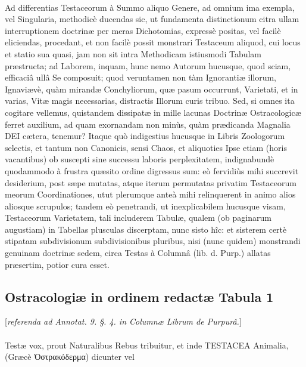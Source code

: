 \documentclass[a4paper, 11pt, oneside, polutonikogreek, german]{article}
\begin{document}
\paragraph{}
Ad differentias Testaceorum à Summo aliquo Genere, ad omnium ima exempla, vel Singularia, methodicè ducendas sic, ut fundamenta distinctionum citra ullam interruptionem doctrinæ per meras Dichotomias, expressè positas, vel facilè eliciendas, procedant, et non facilè possit monstrari Testaceum aliquod, cui locus et statio sua quasi, jam non sit intra Methodicam istiusmodi Tabulam præstructa; ad Laborem, inquam, hunc nemo Autorum hucusque, quod sciam, efficaciâ ullâ Se composuit; quod veruntamen non tàm Ignorantiæ illorum, Ignaviævè, quàm mirandæ Conchyliorum, quæ pasum occurrunt, Varietati, et in varias, Vitæ magis necessarias, distractis Illorum curis tribuo. Sed, si omnes ita cogitare vellemus, quistandem dissipatæ in mille lacunas Doctrinæ Ostracologicæ ferret auxilium, ad quam exornandam non minùs, quàm prædicanda Magnalia DEI cætera, tenemur? Itaque quò indigestius hucusque in Libris Zoologorum selectis, et tantum non Canonicis, sensi Chaos, et aliquoties Ipse etiam (horis vacantibus) ob suscepti sine successu laboris perplexitatem, indignabundè quodammodo à frustra quæsito ordine digressus sum: eò fervidiùs mihi succrevit desiderium, post sæpe mutatas, atque iterum permutatas privatim Testaceorum meorum Coordinationes, utut plerumque anteà mihi relinquerent in animo alios aliosque scrupulos; tandem eò penetrandi, ut inexplicabilem hucusque visam, Testaceorum Varietatem, tali includerem Tabulæ, qualem (ob paginarum augustiam) in Tabellas plusculas discerptam, nunc sisto hîc: et sisterem certè stipatam subdivisionum subdivisionibus pluribus, nisi (nunc quidem) monstrandi genuinam doctrinæ sedem, circa Testas à Columnâ (lib. d. Purp.) allatas præsertim, potior cura esset.
\clearpage
\subsection{Ostracologiæ in ordinem redactæ Tabula 1}
\begin{center}
[\emph{referenda ad Annotat. 9. §. 4. in Columnæ Librum de Purpurâ.}]
\end{center}
\paragraph{}
Testæ vox, prout Naturalibus Rebus tribuitur, et inde TESTACEA Animalia, (Græcè Ὀστρακόδερμα) dicunter vel
\end{document}
